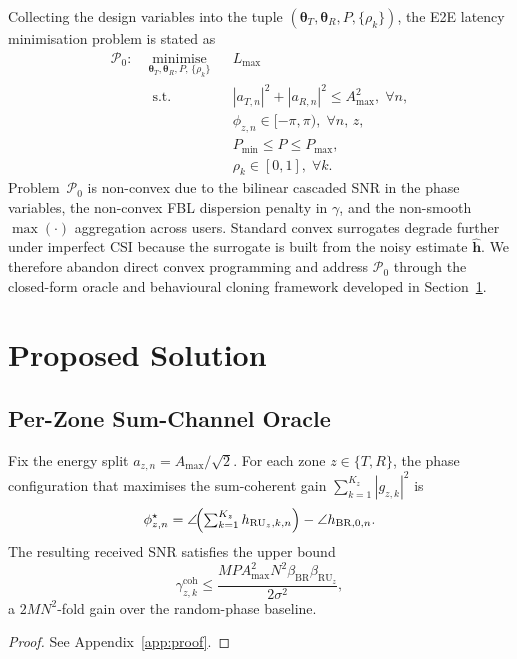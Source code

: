 \documentclass[journal]{IEEEtran}
\newcommand{\vect}[1]{\bm{#1}}
\begin{document}
Collecting the design variables into the tuple
$(\boldsymbol{\theta}_T, \boldsymbol{\theta}_R, P, \{\rho_k\})$,
the E2E latency minimisation problem is stated as
\begin{equation}
\begin{aligned}
\mathcal{P}_{0}:\;
&\underset{\vect{\theta}_T,\vect{\theta}_R,P,\,\{\rho_k\}}{\mathrm{minimise}}
   &&L_{\max} \\
&\;\text{s.t.}
   &&|a_{T,n}|^2+|a_{R,n}|^2\le A_{\max}^2,\;\forall n,\\
&&&\phi_{z,n}\in[-\pi,\pi),\;\forall n,\,z,\\
&&&P_{\min}\le P\le P_{\max},\\
&&&\rho_k\in[0,1],\;\forall k.
\end{aligned}
\label{eq:opt}
\end{equation}
Problem~$\mathcal{P}_0$ is non-convex due to the bilinear cascaded
SNR in the phase variables, the non-convex FBL dispersion penalty in
$\gamma$, and the non-smooth $\max(\cdot)$ aggregation across users.
Standard convex surrogates degrade further under imperfect CSI
because the surrogate is built from the noisy estimate $\hat{\mathbf{h}}$.
We therefore abandon direct convex programming and address
$\mathcal{P}_0$ through the closed-form oracle and behavioural
cloning framework developed in Section~\ref{sec:method}.

\section{Proposed Solution}
\label{sec:method}

\subsection{Per-Zone Sum-Channel Oracle}

\begin{proposition}
\label{prop:opt}
Fix the energy split $a_{z,n}=A_{\max}/\sqrt{2}$. For each zone
$z\!\in\!\{T,R\}$, the phase configuration that maximises the
sum-coherent gain $\sum_{k=1}^{K_z}|g_{z,k}|^2$ is
\begin{equation}
  \phi_{z,n}^{\star}=
  \angle\!\Bigl(\textstyle\sum_{k=1}^{K_z} h_{\mathrm{RU}_z,k,n}\Bigr)
  -\angle h_{\mathrm{BR},0,n}.
  \label{eq:phistar}
\end{equation}
The resulting received SNR satisfies the upper bound
\begin{equation}
  \gamma_{z,k}^{\mathrm{coh}} \le
  \frac{M P A_{\max}^2 N^2
  \beta_{\mathrm{BR}}\beta_{\mathrm{RU}_z}}{2\sigma^2},
  \label{eq:snr_bound}
\end{equation}
a $2MN^2$-fold gain over the random-phase baseline.
\end{proposition}
\begin{proof}
See Appendix~\ref{app:proof}.
\end{proof}
\end{document}
